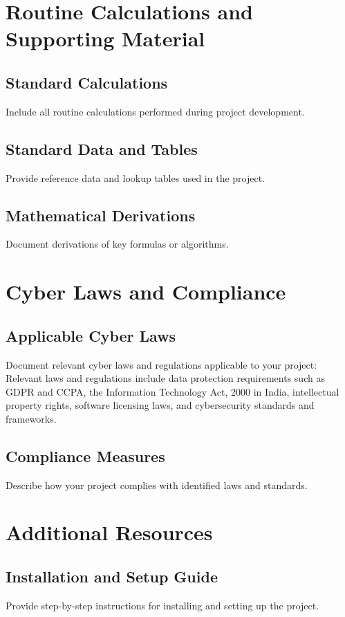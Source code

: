\appendix
\chapter{Routine Calculations and Supporting Material}

\section{Standard Calculations}
Include all routine calculations performed during project development.

\section{Standard Data and Tables}
Provide reference data and lookup tables used in the project.

\section{Mathematical Derivations}
Document derivations of key formulas or algorithms.

\chapter{Cyber Laws and Compliance}

\section{Applicable Cyber Laws}
Document relevant cyber laws and regulations applicable to your project:
Relevant laws and regulations include data protection requirements such as GDPR and CCPA, the Information Technology Act, 2000 in India, intellectual property rights, software licensing laws, and cybersecurity standards and frameworks.

\section{Compliance Measures}
Describe how your project complies with identified laws and standards.

\chapter{Additional Resources}

\section{Installation and Setup Guide}
Provide step-by-step instructions for installing and setting up the project.

